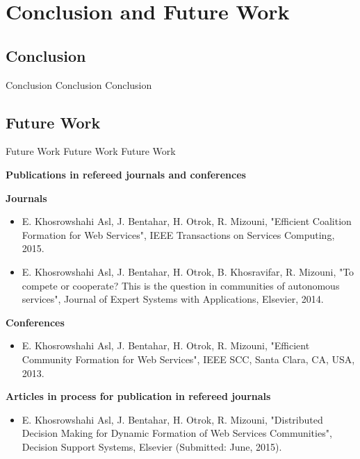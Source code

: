 \chapter{Conclusion and Future Work}\label{Chap5:Conclusion}

\section{Conclusion}

Conclusion Conclusion Conclusion
\section{Future Work}

Future Work Future Work Future Work

\newpage
\textbf{Publications in refereed journals and conferences}

\textbf{Journals}

\begin{itemize}
\item E. Khosrowshahi Asl, J. Bentahar, H. Otrok, R. Mizouni, "Efficient Coalition Formation for Web Services", IEEE Transactions on Services Computing, 2015.

\item E. Khosrowshahi Asl, J. Bentahar, H. Otrok, B. Khosravifar, R. Mizouni, "To compete or cooperate? This is the question in communities of autonomous services", Journal of Expert Systems with Applications, Elsevier, 2014.
    
\end{itemize}

\textbf{Conferences}

\begin{itemize}
\item E. Khosrowshahi Asl, J. Bentahar, H. Otrok, R. Mizouni, "Efficient Community Formation for Web Services",  IEEE SCC, Santa Clara, CA, USA, 2013.

\end{itemize}

\textbf{Articles in process for publication in refereed journals}

\begin{itemize}
\item E. Khosrowshahi Asl, J. Bentahar, H. Otrok, R. Mizouni, "Distributed Decision Making for Dynamic Formation of Web Services Communities", Decision Support Systems, Elsevier (Submitted: June, 2015).
\end{itemize}

